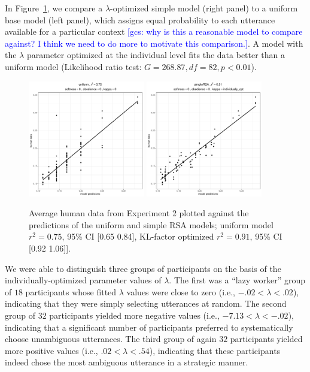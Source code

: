 \documentclass[10pt,a4paper]{article}
\newcommand{\gcs}[1]{\textcolor{blue}{[gcs: #1]}}
\begin{document}
In Figure~\ref{kl-factor}, we compare a $\lambda$-optimized simple model (right panel) to a uniform base model (left panel), which assigns equal probability to each utterance available for a particular context \gcs{why is this a reasonable model to compare against? I think we need to do more to motivate this comparison.}. 
 A model with the $\lambda$ parameter optimized at the individual level fits the data better than a uniform model  (Likelihood ratio test: $G = 268.87, df = 82, p <0.01$). 
\begin{figure}[ht]
	\centering
	\includegraphics[width=2in]{images/x3_m20.pdf}
	\includegraphics[width=2in]{images/x3_m11.pdf}
	\caption{Average human data from Experiment 2 plotted against the predictions of the uniform and simple RSA models; uniform model  $r^{2}=0.75$, 95\% CI [0.65 0.84], KL-factor optimized  $r^{2}=0.91$, 95\% CI [0.92 1.06]]. }\label{kl-factor}
\end{figure}

We were able to distinguish three groups of participants on the basis of the individually-optimized parameter values of $\lambda$. 
The first was a ``lazy worker'' group of $18$ participants whose fitted $\lambda$ values were close to zero (i.e.,  $-.02 < \lambda<.02$), indicating that they were simply selecting utterances at random.
The second group of $32$ participants yielded more negative values (i.e., $-7.13<\lambda<-.02$), indicating that a significant number of participants preferred to systematically choose unambiguous utterances. 
The third group of again $32$ participants yielded more positive values (i.e., $.02<\lambda<.54$), indicating that these participants indeed chose the most ambiguous utterance in a strategic manner. 
\end{document}
